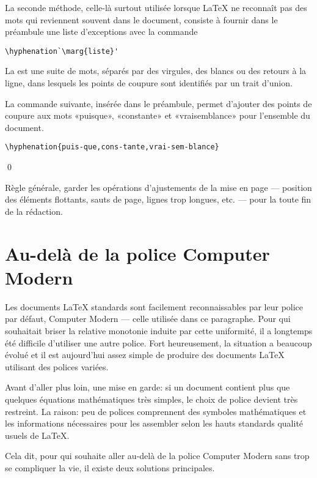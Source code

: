 La seconde méthode, celle-là surtout utilisée lorsque {\LaTeX} ne
reconnaît pas des mots qui reviennent souvent dans le document,
consiste à fournir dans le préambule une liste d'exceptions avec la
commande
\begin{lstlisting}
\hyphenation`\marg{liste}'
\end{lstlisting}
La  est une suite de mots, séparés par des virgules, des
blancs ou des retours à la ligne, dans lesquels les points de coupure
sont identifiés par un trait d'union.

\begin{exemple}
  La commande suivante, insérée dans le préambule, permet d'ajouter
  des points de coupure aux mots «puisque», «constante» et
  «vraisemblance» pour l'ensemble du document.
\begin{lstlisting}
\hyphenation{puis-que,cons-tante,vrai-sem-blance}
\end{lstlisting}
  \qed
\end{exemple}

\begin{important}
  Règle générale, garder les opérations d'ajustements de la mise en
  page --- position des éléments flottants, sauts de page, lignes trop
  longues, etc. --- pour la toute fin de la rédaction.
\end{important}


\section{Au-delà de la police Computer Modern}
\label{sec:trucs:polices}

{\CM%
  Les documents {\LaTeX} standards sont facilement reconnaissables par
  leur police par défaut, Computer Modern --- celle utilisée dans ce
  paragraphe. Pour qui souhaitait briser la relative monotonie induite
  par cette uniformité, il a longtemps été difficile d'utiliser une
  autre police. Fort heureusement, la situation a beaucoup évolué et
  il est aujourd'hui assez simple de produire des documents {\LaTeX}
  utilisant des polices variées.}

Avant d'aller plus loin, une mise en garde: si un document contient
plus que quelques équations mathématiques très simples, le choix de
police devient très restreint. La raison: peu de polices comprennent
des symboles mathématiques et les informations nécessaires pour les
assembler selon les hauts standards qualité usuels de {\LaTeX}.

Cela dit, pour qui souhaite aller au-delà de la police Computer Modern
sans trop se compliquer la vie, il existe deux solutions principales.

